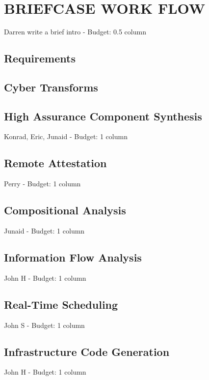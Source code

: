 \documentclass{IEEEcsmag}
\begin{document}
\section{BRIEFCASE WORK FLOW}
Darren write a brief intro -  Budget: 0.5 column
\cite{OSATE}



\subsection{Requirements}


\subsection{Cyber Transforms}


\subsection{High Assurance Component Synthesis}
Konrad, Eric, Junaid -  Budget: 1 column
\cite{case-verified-filter} \cite{hardin-co-assurance}
\cite{formal-filter-synth-langsec} \cite{contiguity-types} 

\subsection{Remote Attestation}
Perry -  Budget: 1 column
\cite{copland-attestation} \cite{copland-verification}

\subsection{Compositional Analysis}
Junaid -  Budget: 1 column


\subsection{Information Flow Analysis}
John H -  Budget: 1 column



\subsection{Real-Time Scheduling}
John S -  Budget: 1 column

\subsection{Infrastructure Code Generation}
John H -  Budget: 1 column
\end{document}

